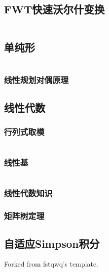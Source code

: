 \documentclass[a4paper]{article}
\begin{document}
\begin{multicols}{2}
			\subsection{FWT快速沃尔什变换}
				\inputminted{cpp}{../src/math/FWT.cpp}

			\subsection{单纯形}
				\inputminted{cpp}{../src/math/单纯形.cpp}

				\subsubsection{线性规划对偶原理}
					

			\subsection{线性代数}


				\subsubsection{行列式取模}
					\inputminted{cpp}{../src/math/行列式取模.cpp}



				\subsubsection{线性基}
					\inputminted{cpp}{../src/math/线性基.cpp}


				\subsubsection{线性代数知识}
					
				
				\subsubsection{矩阵树定理}
					

			\subsection{自适应Simpson积分}
				Forked from fstqwq's template.
				\inputminted{cpp}{../src/math/simpson.cpp}


\end{multicols}
\end{document}

